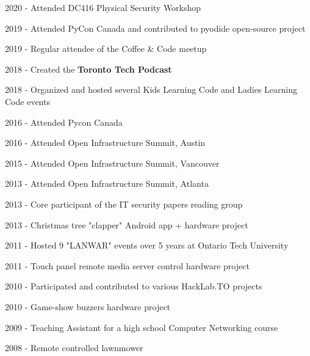 \documentclass[margin,line]{resume}
\begin{document}
\begin{resume}
    \begin{list2}
        \item 2020 - Attended DC416 Physical Security Workshop
        \item 2019 - Attended PyCon Canada and contributed to pyodide open-source project
        \item 2019 - Regular attendee of the Coffee \& Code meetup
        \item 2018 - Created the \textbf{Toronto Tech Podcast}
        \item 2018 - Organized and hosted several Kids Learning Code and Ladies Learning Code events
        \item 2016 - Attended Pycon Canada
        \item 2016 - Attended Open Infrastructure Summit, Austin
        \item 2015 - Attended Open Infrastructure Summit, Vancouver
        \item 2013 - Attended Open Infrastructure Summit, Atlanta
        \item 2013 - Core participant of the IT security papers reading group
        \item 2013 - Christmas tree "clapper" Android app + hardware project
        \item 2011 - Hosted 9 "LANWAR" events over 5 years at Ontario Tech University
        \item 2011 - Touch panel remote media server control hardware project
        \item 2010 - Participated and contributed to various HackLab.TO projects
        \item 2010 - Game-show buzzers hardware project
        \item 2009 - Teaching Assistant for a high school Computer Networking course
        \item 2008 - Remote controlled lawnmower
    \end{list2}\vspace{-1.5mm}


\end{resume}
\end{document}
